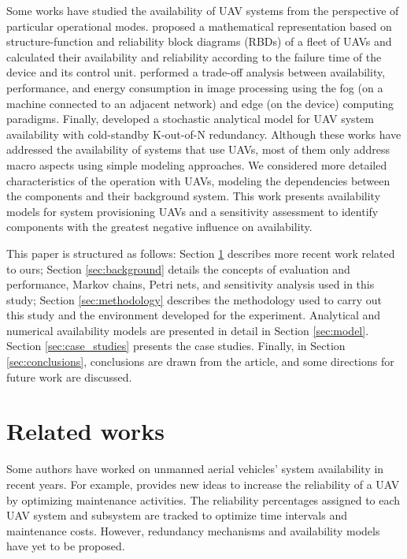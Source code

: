 \documentclass[conference]{IEEEtran}
\begin{document}
Some works have studied the availability of UAV systems from the perspective of particular operational modes. \citet{Zaitseva2020, rusnak2019reliability} proposed a mathematical representation based on structure-function and reliability block diagrams (RBDs) of a fleet of UAVs and calculated their availability and reliability according to the failure time of the device and its control unit. \citet{Machida2021, watanabe2022availability} performed a trade-off analysis between availability, performance, and energy consumption in image processing using the fog (on a machine connected to an adjacent network) and edge (on the device) computing paradigms. Finally, \citet{Maccarthy2019} developed a stochastic analytical model for UAV system availability with cold-standby K-out-of-N redundancy. Although these works have addressed the availability of systems that use UAVs, most of them only address macro aspects using simple modeling approaches. We considered more detailed characteristics of the operation with UAVs, modeling the dependencies between the components and their background system. This work presents availability models for system provisioning UAVs and a sensitivity assessment to identify components with the greatest negative influence on availability.

This paper is structured as follows: Section \ref{sec:related_works} describes more recent work related to ours; Section \ref{sec:background} details the concepts of evaluation and performance, Markov chains, Petri nets, and sensitivity analysis used in this study; Section \ref{sec:methodology} describes the methodology used to carry out this study and the environment developed for the experiment. Analytical and numerical availability models are presented in detail in Section \ref{sec:model}. Section \ref{sec:case_studies} presents the case studies. Finally, in Section \ref{sec:conclusions}, conclusions are drawn from the article, and some directions for future work are discussed.

\section{Related works}
\label{sec:related_works}

Some authors have worked on unmanned aerial vehicles' system availability in recent years. For example,  \citet{Petritoli2017, Petritoli2018} provides new ideas to increase the reliability of a UAV by optimizing maintenance activities. The reliability percentages assigned to each UAV system and subsystem are tracked to optimize time intervals and maintenance costs. However, redundancy mechanisms and availability models have yet to be proposed.
\end{document}
